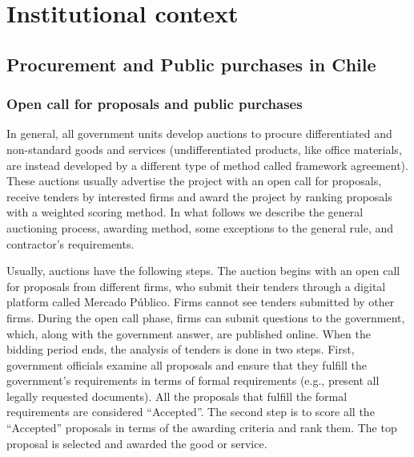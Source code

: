 \chapter{Institutional context}
\section{Procurement and Public purchases in Chile}
\subsection{Open call for proposals and public purchases}
In general, all government units develop auctions to procure differentiated and non-standard goods and services (undifferentiated products, like office materials, are instead developed by a different type of method called framework agreement).  These auctions usually advertise the project with an open call for proposals, receive tenders by interested firms and award the project by ranking proposals with a weighted scoring method. In what follows we describe the general auctioning process, awarding method, some exceptions to the general rule, and contractor’s requirements.

Usually, auctions have the following steps. The auction begins with an open call for proposals from different firms, who submit their tenders through a digital platform called Mercado Público. Firms cannot see tenders submitted by other firms. During the open call phase, firms can submit questions to the government, which, along with the government answer, are published online. When the bidding period ends, the analysis of tenders is done in two steps. First, government officials examine all proposals and ensure that they fulfill the government’s requirements in terms of formal requirements (e.g., present all legally requested documents). All the proposals that fulfill the formal requirements are considered “Accepted”. The second step is to score all the “Accepted” proposals in terms of the awarding criteria and rank them. The top proposal is selected and awarded the good or service.

